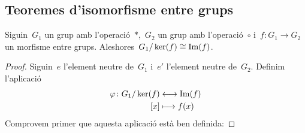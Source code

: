 \documentclass[../estructures-algebraiques.tex]{subfiles}
\begin{document}
    \subsection{Teoremes d'isomorfisme entre grups}
    \begin{theorem}
        \label{thm:Teorema-fonamental-dels-isomorfismes}%
            Siguin~\(G_{1}\) un grup amb l'operació~\(\ast\),~\(G_{2}\) un grup amb l'operació~\(\circ\) i~\(f\colon G_{1}\to G_{2}\) un morfisme entre grups.
            Aleshores~\(G_{1}/\operatorname{ker}(f)\cong\operatorname{Im}(f)\).
    \end{theorem}
    \begin{proof}
        Siguin~\(e\) l'element neutre de~\(G_{1}\) i~\(e'\) l'element neutre de~\(G_{2}\).
        Definim l'aplicació
        \begin{align}
        \label{thm:Teorema-fonamental-dels-isomorfismes:eq1}
        \varphi\colon G_{1}/\operatorname{ker}(f)&\longleftrightarrow\operatorname{Im}(f)\\
        [x]&\longmapsto f(x)\nonumber
        \end{align}
        Comprovem primer que aquesta aplicació està ben definida:


\end{proof}
\end{document}
